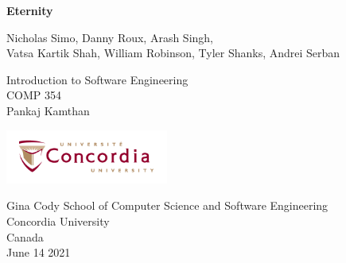 \begin{titlepage}
   \begin{center}
       \vspace*{1cm}

       \Huge
       \textbf{Eternity}

        \vspace{0.5cm}
        \Large
        Nicholas Simo, Danny Roux, Arash Singh,
        \\Vatsa Kartik Shah, William Robinson, Tyler Shanks, Andrei Serban
       
       \vspace{6cm}
        Introduction to Software Engineering
        \\COMP 354
        \\Pankaj Kamthan

        
       \vspace{1.5cm}
        
        \Large

       \vfill
            
       \vspace{0.8cm}
     
       \includegraphics[width=0.4\textwidth]{images/concologo.png}

       Gina Cody School of Computer Science and Software Engineering\\
       Concordia University\\
       Canada\\
       June 14 2021
            
   \end{center}
\end{titlepage}
